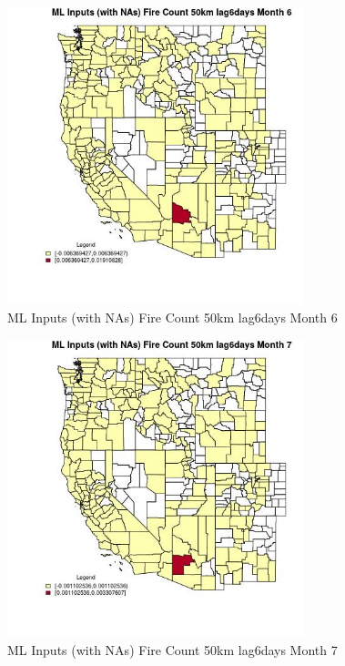 \begin{figure} 
\centering  
\includegraphics[width=0.77\textwidth]{Code_Outputs/Report_ML_input_PM25_Step4_part_e_de_duplicated_aves_compiled_2019-05-20wNAs_CountyFire_Count_50km_lag6daysmedianMonth6.jpg} 
\caption{\label{fig:Report_ML_input_PM25_Step4_part_e_de_duplicated_aves_compiled_2019-05-20wNAsCountyFire_Count_50km_lag6daysmedianMonth6}ML Inputs (with NAs) Fire Count 50km lag6days Month 6} 
\end{figure} 
 

\begin{figure} 
\centering  
\includegraphics[width=0.77\textwidth]{Code_Outputs/Report_ML_input_PM25_Step4_part_e_de_duplicated_aves_compiled_2019-05-20wNAs_CountyFire_Count_50km_lag6daysmedianMonth7.jpg} 
\caption{\label{fig:Report_ML_input_PM25_Step4_part_e_de_duplicated_aves_compiled_2019-05-20wNAsCountyFire_Count_50km_lag6daysmedianMonth7}ML Inputs (with NAs) Fire Count 50km lag6days Month 7} 
\end{figure} 
 

